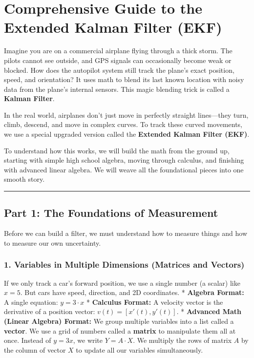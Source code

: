 \documentclass[
]{article}
\author{}
\date{}
\begin{document}
\section{Comprehensive Guide to the Extended Kalman Filter
(EKF)}\label{comprehensive-guide-to-the-extended-kalman-filter-ekf}

Imagine you are on a commercial airplane flying through a thick storm.
The pilots cannot see outside, and GPS signals can occasionally become
weak or blocked. How does the autopilot system still track the plane's
exact position, speed, and orientation? It uses math to blend its last
known location with noisy data from the plane's internal sensors. This
magic blending trick is called a \textbf{Kalman Filter}.

In the real world, airplanes don't just move in perfectly straight
lines---they turn, climb, descend, and move in complex curves. To track
these curved movements, we use a special upgraded version called the
\textbf{Extended Kalman Filter (EKF)}.

To understand how this works, we will build the math from the ground up,
starting with simple high school algebra, moving through calculus, and
finishing with advanced linear algebra. We will weave all the
foundational pieces into one smooth story.

\begin{center}\rule{0.5\linewidth}{0.5pt}\end{center}

\subsection{Part 1: The Foundations of
Measurement}\label{part-1-the-foundations-of-measurement}

Before we can build a filter, we must understand how to measure things
and how to measure our own uncertainty.

\subsubsection{1. Variables in Multiple Dimensions (Matrices and
Vectors)}\label{variables-in-multiple-dimensions-matrices-and-vectors}

If we only track a car's forward position, we use a single number (a
scalar) like \(x = 5\). But cars have speed, direction, and 2D
coordinates. * \textbf{Algebra Format:} A single equation:
\(y = 3 \cdot x\) * \textbf{Calculus Format:} A velocity vector is the
derivative of a position vector: \(v(t) = [x'(t), y'(t)]\). *
\textbf{Advanced Math (Linear Algebra) Format:} We group multiple
variables into a list called a \textbf{vector}. We use a grid of numbers
called a \textbf{matrix} to manipulate them all at once. Instead of
\(y = 3x\), we write \(Y = A \cdot X\). We multiply the rows of matrix
\(A\) by the column of vector \(X\) to update all our variables
simultaneously.
\end{document}
